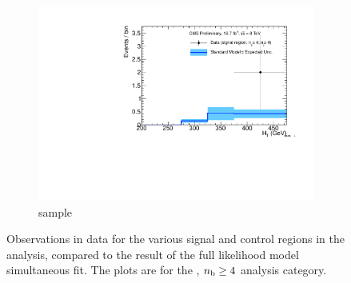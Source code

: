 \begin{figure}[h!]
\begin{subfigure}[b]{0.48\textwidth}
    \includegraphics[width=\textwidth,page=4]
    {Figs/results/v0/blueBand/bestFit_2012dev_RQcdZero_fZinvAll_ge4b_ge4j-1h_smOnly}
    \caption{\mj sample}
  \end{subfigure}
  \caption{Observations in data for the various signal and control
  regions in the analysis, compared to the result of the full likelihood model
  simultaneous fit. The plots are for the \njhigh, $n_{\text{b}} \geq 4$ analysis category.}
  \label{fig:blue_fits_ge4b_ge4j}
\end{figure}
